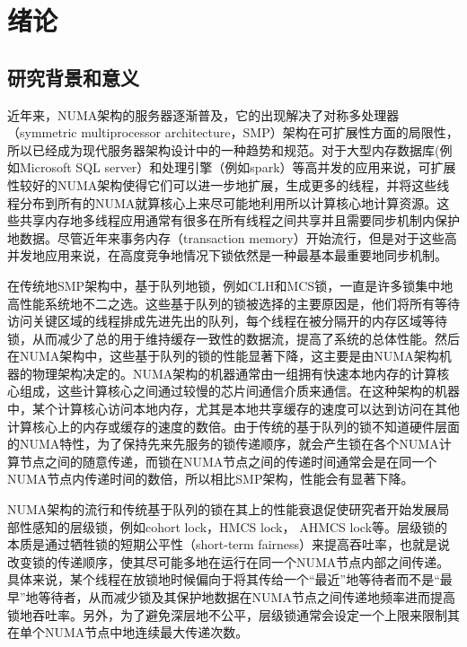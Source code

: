 
\chapter{绪论}
\label{chap:intro}


\section{研究背景和意义}
近年来，NUMA架构的服务器逐渐普及，它的出现解决了对称多处理器（symmetric multiprocessor architecture，SMP）架构在可扩展性方面的局限性，所以已经成为现代服务器架构设计中的一种趋势和规范。对于大型内存数据库(例如Microsoft SQL server）和处理引擎（例如spark）等高并发的应用来说，可扩展性较好的NUMA架构使得它们可以进一步地扩展，生成更多的线程，并将这些线程分布到所有的NUMA就算核心上来尽可能地利用所以计算核心地计算资源。这些共享内存地多线程应用通常有很多在所有线程之间共享并且需要同步机制内保护地数据。尽管近年来事务内存（transaction memory）开始流行，但是对于这些高并发地应用来说，在高度竞争地情况下锁依然是一种最基本最重要地同步机制。

在传统地SMP架构中，基于队列地锁，例如CLH和MCS锁，一直是许多锁集中地高性能系统地不二之选。这些基于队列的锁被选择的主要原因是，他们将所有等待访问关键区域的线程排成先进先出的队列，每个线程在被分隔开的内存区域等待锁，从而减少了总的用于维持缓存一致性的数据流，提高了系统的总体性能。然后在NUMA架构中，这些基于队列的锁的性能显著下降，这主要是由NUMA架构机器的物理架构决定的。NUMA架构的机器通常由一组拥有快速本地内存的计算核心组成，这些计算核心之间通过较慢的芯片间通信介质来通信。在这种架构的机器中，某个计算核心访问本地内存，尤其是本地共享缓存的速度可以达到访问在其他计算核心上的内存或缓存的速度的数倍。由于传统的基于队列的锁不知道硬件层面的NUMA特性，为了保持先来先服务的锁传递顺序，就会产生锁在各个NUMA计算节点之间的随意传递，而锁在NUMA节点之间的传递时间通常会是在同一个NUMA节点内传递时间的数倍，所以相比SMP架构，性能会有显著下降。

NUMA架构的流行和传统基于队列的锁在其上的性能衰退促使研究者开始发展局部性感知的层级锁，例如cohort lock，HMCS lock， AHMCS lock等。层级锁的本质是通过牺牲锁的短期公平性（short-term fairness）来提高吞吐率，也就是说改变锁的传递顺序，使其尽可能多地在运行在同一个NUMA节点内部之间传递。具体来说，某个线程在放锁地时候偏向于将其传给一个“最近”地等待者而不是“最早”地等待者，从而减少锁及其保护地数据在NUMA节点之间传递地频率进而提高锁地吞吐率。另外，为了避免深层地不公平，层级锁通常会设定一个上限来限制其在单个NUMA节点中地连续最大传递次数。

